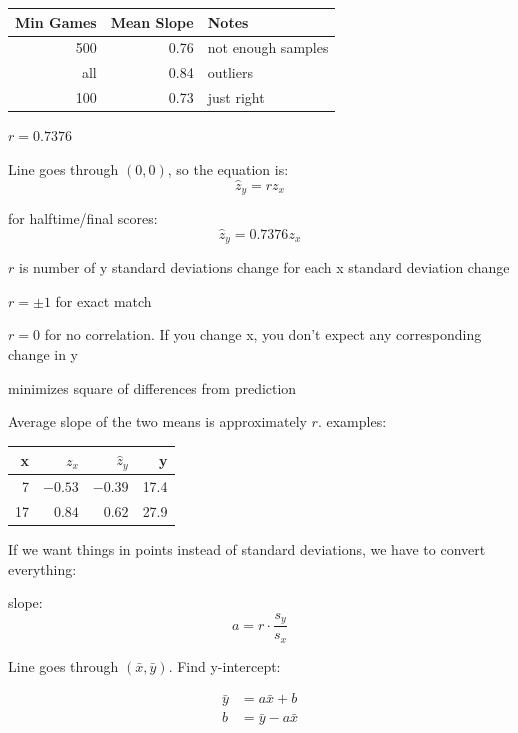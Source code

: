 \documentclass[letterpaper, landscape]{exam}
\begin{document}
  \begin{tabular}[H]{rrl}
    \toprule
    Min Games & Mean Slope & Notes \\
    \midrule
    500       & 0.76       & not enough samples\\
    all       & 0.84       & outliers \\
    100       & 0.73       & just right \\
    \bottomrule
  \end{tabular}

  $r = 0.7376$

  Line goes through $(0, 0)$, so the equation is:
  \[
    \hat{z}_y = r z_x
  \]

  for halftime/final scores:
  \[
    \hat{z}_y = 0.7376 z_x
  \]

  \begin{itemize*}
    \item $r$ is number of y standard deviations change for each x standard
      deviation change 

    \item $r = \pm 1$ for exact match

    \item $r = 0$ for no correlation.  If you change x, you don't expect any
      corresponding change in y

    \item minimizes square of differences from prediction
  \end{itemize*}

  Average slope of the two means is approximately $r$.
  examples:

  \begin{tabular}[H]{rrrr}
    \toprule
    x  & $z_x$   & $\hat{z}_y$ & y \\
    \midrule
    7  & $-0.53$ & $-0.39$     & 17.4 \\
    17 & $0.84$  & $0.62$      & 27.9 \\
    \bottomrule
  \end{tabular}

  If we want things in points instead of standard deviations, we have to convert
  everything:

  slope:
  \[
    a = r \cdot \frac{s_y}{s_x}
  \]

  Line goes through $(\bar{x}, \bar{y})$.  Find y-intercept:

  \begin{align*}
    \bar{y} & = a \bar{x} + b \\
    b         & = \bar{y} - a \bar{x} \\
  \end{align*}
\end{document}
